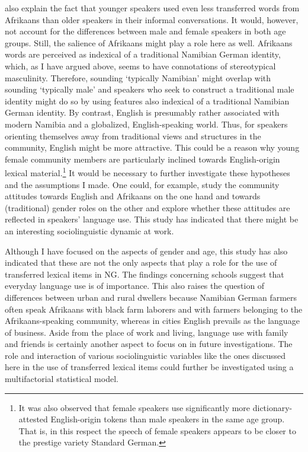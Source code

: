 \documentclass[output=paper]{langsci/langscibook}
\begin{document}
also explain the fact that younger speakers used even less transferred words from Afrikaans than older speakers in their informal conversations. It would, however, not account for the differences between male and female speakers in both age groups. Still, the salience of Afrikaans might play a role here as well. Afrikaans words are perceived as indexical of a traditional Namibian German identity, which, as I have argued above, seems to have connotations of stereotypical masculinity. Therefore, sounding ‘typically Namibian’ might overlap with sounding ‘typically male’ and speakers who seek to construct a traditional male identity might do so by using features also indexical of a traditional Namibian German identity. By contrast, English is presumably rather associated with modern Namibia and a globalized, English-speaking world. Thus, for speakers orienting themselves away from traditional views and structures in the community, English might be more attractive. This could be a reason why young female community members are particularly inclined towards English-origin lexical material.\footnote{It was also observed that female speakers use significantly more dictionary-attested English-origin tokens than male speakers in the same age group. That is, in this respect the speech of female speakers appears to be closer to the prestige variety Standard German.} It would be necessary to further investigate these hypotheses and the assumptions I made. One could, for example, study the community attitudes towards English and Afrikaans on the one hand and towards (traditional) gender roles on the other and explore whether these attitudes are reflected in speakers’ language use. This study has indicated that there might be an interesting sociolinguistic dynamic at work.

Although I have focused on the aspects of gender and age, this study has also indicated that these are not the only aspects that play a role for the use of transferred lexical items in NG. The findings concerning schools suggest that everyday language use is of importance. This also raises the question of differences between urban and rural dwellers because Namibian German farmers often speak Afrikaans with black farm laborers and with farmers belonging to the Afrikaans-speaking community, whereas in cities English prevails as the language of business. Aside from the place of work and living, language use with family and friends is certainly another aspect to focus on in future investigations. The role and interaction of various sociolinguistic variables like the ones discussed here in the use of transferred lexical items could further be investigated using a multifactorial statistical model.
\end{document}
